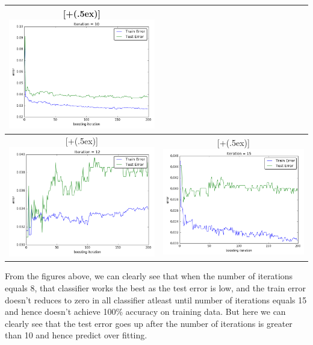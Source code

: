 \documentclass{article}
\newcommand*{\addheight}[2][.5ex]{%
  \raisebox{0pt}[\dimexpr\height+(#1)\relax]{#2}%
}
\begin{document}
\begin{enumerate}
\begin{table}[h!]
\begin{tabular}{|c|c|}
	\addheight{\includegraphics[width=70mm]{images/perceptron/10.png}} \\  
    \hline 
    \addheight{\includegraphics[width=70mm]{images/perceptron/12.png}} &
	\addheight{\includegraphics[width=70mm]{images/perceptron/15.png}} \\  
    \hline 
\end{tabular}
\end{table}

From the figures above, we can clearly see that when the number of iterations equals 8, that classifier works the best as the test error is low, and the train error doesn't reduces to zero in all classifier atleast until number of iterations equals 15 and hence doesn't achieve 100\% accuracy on training data. But here we can clearly see that the test error goes up after the number of iterations is greater than 10 and hence predict over fitting.
\end{enumerate}
\end{document}
